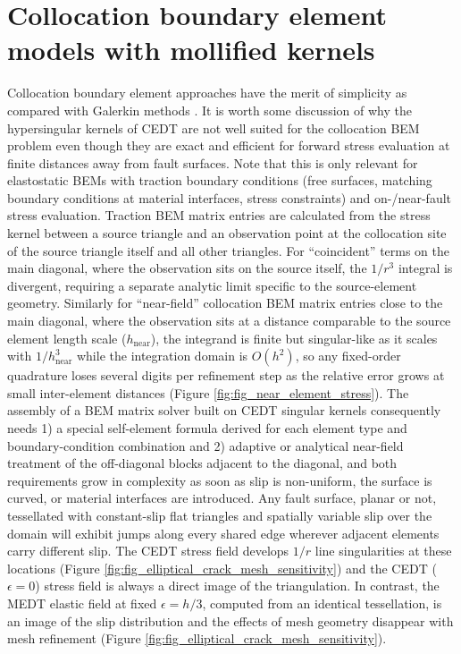 \documentclass[12pt]{article}
\newcommand{\eps}{\epsilon}
\begin{document}
\section{Collocation boundary element models with mollified kernels}
Collocation boundary element approaches have the merit of simplicity \citep{CrouchStarfield1983} as compared with Galerkin methods \citep[e.g.,][]{SirtoriS.1992Agsb, sutradhar2008symmetric}.  It is worth some discussion of why the hypersingular kernels of CEDT \citep{Okada1992, Meade2007, NikkhooWalter2015} are not well suited for the collocation BEM problem even though they are exact and efficient for forward stress evaluation at finite distances away from fault surfaces.  Note that this is only relevant for elastostatic BEMs with traction boundary conditions (free surfaces, matching boundary conditions at material interfaces, stress constraints) and on-/near-fault stress evaluation. Traction BEM matrix entries are calculated from the stress kernel between a source triangle and an observation point at the collocation site of the source triangle itself and all other triangles.  For ``coincident'' terms on the main diagonal, where the observation sits on the source itself, the $1/r^3$ integral is divergent, requiring a separate analytic limit specific to the source-element geometry.  Similarly for ``near-field'' collocation BEM matrix entries close to the main diagonal, where the observation sits at a distance comparable to the source element length scale ($h_{\text{near}}$), the integrand is finite but singular-like as it scales with $1/h_{\text{near}}^3$ while the integration domain is $O(h^2)$, so any fixed-order quadrature loses several digits per refinement step as the relative error grows at small inter-element distances (Figure \ref{fig:fig_near_element_stress}).  The assembly of a BEM matrix solver built on CEDT singular kernels consequently needs 1) a special self-element formula derived for each element type and boundary-condition combination and 2) adaptive or analytical near-field treatment of the off-diagonal blocks adjacent to the diagonal, and both requirements grow in complexity as soon as slip is non-uniform, the surface is curved, or material interfaces are introduced.  Any fault surface, planar or not, tessellated with constant-slip flat triangles and spatially variable slip over the domain will exhibit jumps along every shared edge wherever adjacent elements carry different slip.  The CEDT stress field develops $1/r$ line singularities at these locations (Figure \ref{fig:fig_elliptical_crack_mesh_sensitivity}) and the CEDT ($\eps=0$) stress field is always a direct image of the triangulation. In contrast, the MEDT elastic field at fixed $\eps=h/3$, computed from an identical tessellation, is an image of the slip distribution and the effects of mesh geometry disappear with mesh refinement (Figure \ref{fig:fig_elliptical_crack_mesh_sensitivity}).
\end{document}

